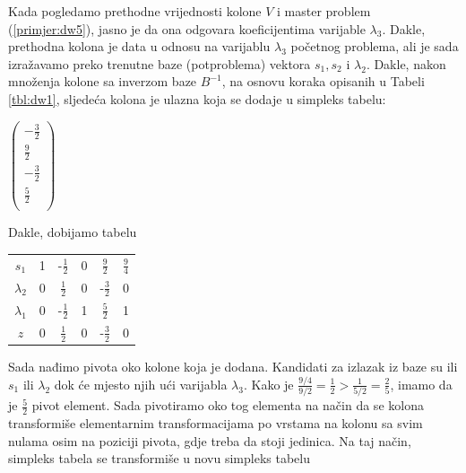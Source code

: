 \documentclass[a4paper, utf8, 11pt, colorlinks]{book}
\begin{document}
Kada pogledamo prethodne vrijednosti kolone $V$ i master problem (\ref{primjer:dw5}), jasno je da ona odgovara koeficijentima varijable $\lambda_3$. Dakle, prethodna kolona je data u odnosu na varijablu $\lambda_3$ početnog problema, ali je sada izražavamo preko trenutne baze (potproblema) vektora $s_1, s_2$ i $\lambda_2$. Dakle, nakon množenja kolone sa inverzom baze $B^{-1}$, na osnovu koraka opisanih u Tabeli \ref{tbl:dw1}, sljedeća kolona je ulazna koja se dodaje u simpleks tabelu:

\begin{center}
 
  $\begin{pmatrix}
	 -\frac{3}{2}            \\
	 \frac{9}{2}     \\
 	-\frac{3}{2}       \\
	 \frac{5}{2}    \\
   \end{pmatrix}$
\end{center}
Dakle, dobijamo tabelu 

\begin{center}
 
		\begin{tabular}{c|cccc|c}
		   $s_1$	    &   1      &   -$\frac{1}{2}$         &   0         &   $\frac{9}{2}$          &  $\frac{9}{4}$ \\
		   $\lambda_2$  &   0      &    $\frac{1}{2}$         &   0         &  -$ \frac{3}{2}$         &  0             \\
		   $\lambda_1$  &   0      &    -$\frac{1}{2}$        &   1         &  $\frac{5}{2} $          &  1             \\ \hline
		   $z$          &   0      &    $\frac{1}{2}$         &   0         &   -$\frac{3}{2}$       & 0  
	\end{tabular}
 
\end{center} 
Sada nađimo pivota oko kolone koja je dodana. Kandidati za izlazak iz baze su ili $s_1$ ili $\lambda_2$ dok će mjesto njih ući varijabla $\lambda_3$. Kako je $\frac{9/4}{9/2}=\frac{1}{2} > \frac{1}{5/2}=\frac{2}{5}$, imamo da je $\frac{5}{2}$ pivot element. Sada pivotiramo oko tog elementa na način da se kolona transformiše elementarnim transformacijama po vrstama na kolonu sa svim nulama osim na poziciji pivota, gdje treba da stoji jedinica. Na taj način, simpleks tabela se transformiše u novu simpleks tabelu 
\end{document}
